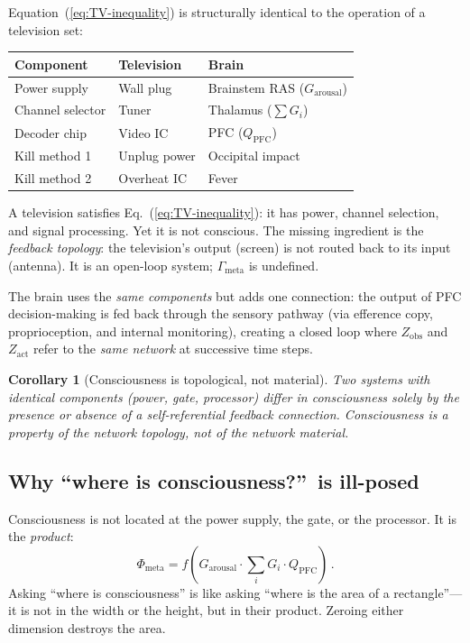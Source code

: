 \documentclass[aps,pre,twocolumn,superscriptaddress,floatfix]{revtex4-2}
\newtheorem{corollary}{Corollary}
\newcommand{\Gmeta}{\Gamma_{\text{meta}}}
\newcommand{\Phimeta}{\Phi_{\text{meta}}}
\newcommand{\Zarousal}{G_{\text{arousal}}}
\newcommand{\QPFC}{Q_{\text{PFC}}}
\begin{document}
Equation~(\ref{eq:TV-inequality}) is structurally identical
to the operation of a television set:
\begin{center}
\begin{tabular}{@{}lll@{}}
\toprule
Component & Television & Brain \\
\midrule
Power supply & Wall plug & Brainstem RAS ($\Zarousal$) \\
Channel selector & Tuner & Thalamus ($\sum G_i$) \\
Decoder chip & Video IC & PFC ($\QPFC$) \\
\midrule
Kill method 1 & Unplug power & Occipital impact \\
Kill method 2 & Overheat IC & Fever \\
\bottomrule
\end{tabular}
\end{center}

A television satisfies Eq.~(\ref{eq:TV-inequality}): it has
power, channel selection, and signal processing.
Yet it is not conscious.  The missing ingredient is the
\emph{feedback topology}: the television's output (screen)
is not routed back to its input (antenna).
It is an open-loop system; $\Gmeta$ is undefined.

The brain uses the \emph{same components} but adds one
connection: the output of PFC decision-making is fed back
through the sensory pathway (via efference copy, proprioception,
and internal monitoring), creating a closed loop where
$Z_{\text{obs}}$ and $Z_{\text{act}}$ refer to the
\emph{same network} at successive time steps.

\begin{corollary}[Consciousness is topological, not material]
Two systems with identical components (power, gate, processor)
differ in consciousness solely by the presence or absence of
a self-referential feedback connection.
Consciousness is a property of the network \emph{topology},
not of the network \emph{material}.
\end{corollary}

\subsection{Why ``where is consciousness?''\ is ill-posed}

Consciousness is not located at the power supply, the gate,
or the processor.  It is the \emph{product}:
\begin{equation}
  \Phimeta = f\!\left(
    \Zarousal \cdot \textstyle\sum_i G_i \cdot \QPFC
  \right)\,.
  \label{eq:consciousness-product}
\end{equation}
Asking ``where is consciousness'' is like asking ``where is
the area of a rectangle''---it is not in the width or the
height, but in their product.  Zeroing either dimension
destroys the area.
\end{document}
